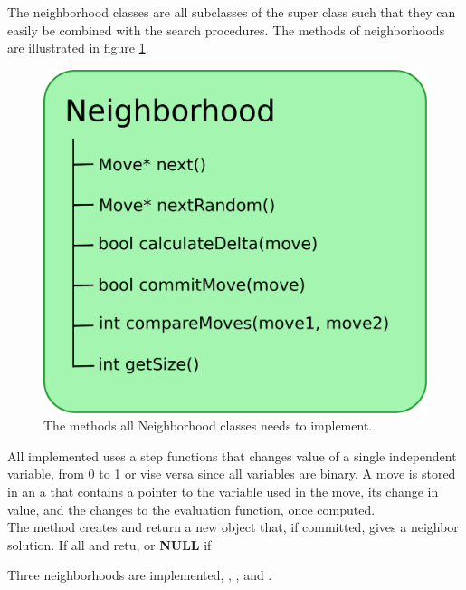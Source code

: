 The neighborhood classes are all subclasses of the super class  such that they can easily be 
combined with the search procedures. The methods of neighborhoods are illustrated in figure \ref{fig_neighbborhood}. \\
\begin{figure}[!b]
\begin{center}
\includegraphics[width=0.9\linewidth]{neighborhood}\caption{The methods all Neighborhood classes needs to implement.} 
\label{fig_neighbborhood}
\end{center}
\end{figure}
All  implemented uses a step functions that changes value of a single independent variable, from 
0 to 1 or vise versa since all variables are binary. A move is stored in an a  that contains a pointer 
to the variable used in the move, its change in value, and the changes to the evaluation function, once computed. \\ 
The method  creates and return a new  object that, if committed, gives a neighbor solution.  
If all and retu, or \textbf{NULL} if 

Three neighborhoods are implemented, , , and 
. 

